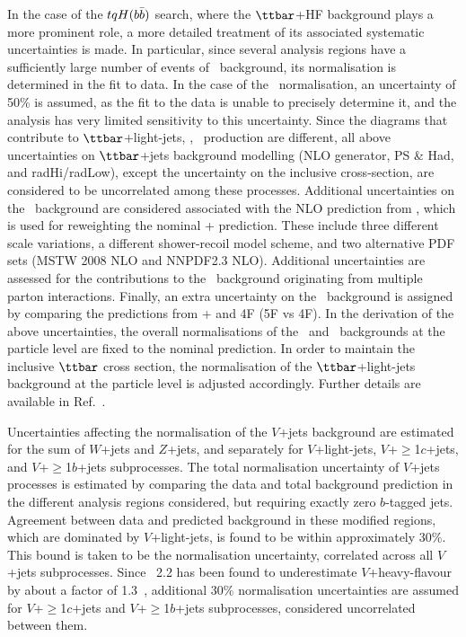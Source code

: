 In the case of the $tqH(b\bar{b})$ search, where the $\ttbar$+HF background plays a more prominent role, a more 
detailed treatment of its associated systematic uncertainties is made. In particular, since several analysis 
regions have a sufficiently large number of events of \ttbin\ background, its normalisation is 
determined in the fit to data.
In the case of the \ttcin\ normalisation, an uncertainty of 50\% is assumed, as the fit to the data is unable 
to precisely determine it, and the analysis has very limited sensitivity to this uncertainty.
Since the diagrams that contribute to $\ttbar$+light-jets, \ttcin, \ttbin\
production are different, all above uncertainties on $\ttbar$+jets
background modelling (NLO generator, PS \& Had, and radHi/radLow), except the uncertainty on the inclusive cross-section, are
considered to be uncorrelated among these processes.
Additional uncertainties on the \ttbin\ background are considered associated with the NLO prediction from {\ShOL}, 
which is used for reweighting the nominal {\powheg}+{\pythiaeight} prediction. 
These include three different scale variations,  a different shower-recoil model scheme, and 
two alternative PDF sets (MSTW 2008 NLO and NNPDF2.3 NLO). Additional uncertainties are assessed for
the contributions to the \ttbin\ background originating from multiple parton interactions.
Finally, an extra uncertainty on the \ttbin\ background is assigned by comparing 
the predictions from {\powheg}+{\pythiaeight} and {\ShOL} 4F (5F vs 4F).
In the derivation of the above uncertainties, the overall normalisations of the \ttcin\ and \ttbin\ backgrounds 
at the particle level are fixed to the nominal prediction. In order to maintain the inclusive $\ttbar$ cross section, 
the normalisation of the $\ttbar$+light-jets background at the particle level is adjusted accordingly.
Further details are available in Ref.~\cite{Aaboud:2017rss}.

Uncertainties affecting the normalisation of the $V$+jets background are estimated for the sum
of $W$+jets and $Z$+jets, and separately for $V$+light-jets, $V$+$\geq$1$c$+jets, and $V$+$\geq$1$b$+jets subprocesses.
The total normalisation uncertainty of $V$+jets processes is estimated by comparing the data and total background prediction in 
the different analysis regions considered, but requiring exactly zero $b$-tagged jets. Agreement between data and predicted background 
in these modified regions, which are dominated by $V$+light-jets, is found to be within approximately 30\%. This bound is taken to 
be the normalisation uncertainty, correlated across all $V$+jets subprocesses. 
Since {\sherpa}~2.2 has been found to underestimate $V$+heavy-flavour by about a factor
of 1.3~\cite{Aaboud:2017xsd}, additional 30\% normalisation uncertainties are assumed for $V$+$\geq$1$c$+jets and $V$+$\geq$1$b$+jets
subprocesses, considered uncorrelated between them.

